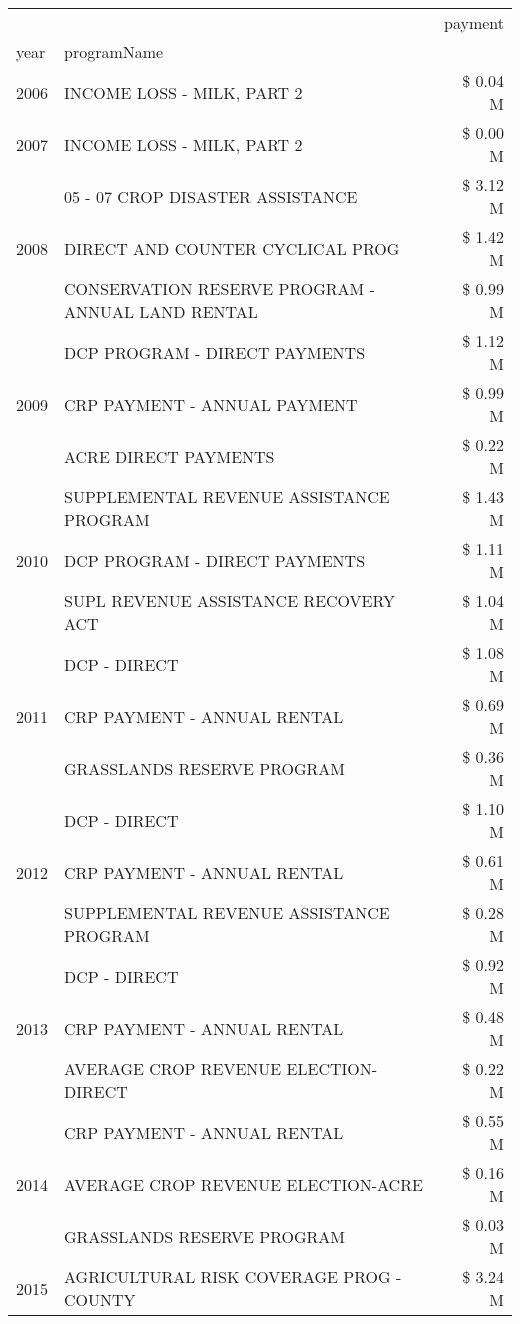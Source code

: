\begin{tabular}{llr}
\toprule
 &  & payment \\
year & programName &  \\
\midrule
2006 & INCOME LOSS - MILK, PART 2 & \$ 0.04 M \\
\cline{1-3}
2007 & INCOME LOSS - MILK, PART 2 & \$ 0.00 M \\
\cline{1-3}
\multirow[t]{3}{*}{2008} & 05 - 07 CROP DISASTER ASSISTANCE & \$ 3.12 M \\
 & DIRECT AND COUNTER CYCLICAL PROG & \$ 1.42 M \\
 & CONSERVATION RESERVE PROGRAM - ANNUAL LAND RENTAL & \$ 0.99 M \\
\cline{1-3}
\multirow[t]{3}{*}{2009} & DCP PROGRAM - DIRECT PAYMENTS & \$ 1.12 M \\
 & CRP PAYMENT - ANNUAL PAYMENT & \$ 0.99 M \\
 & ACRE DIRECT PAYMENTS & \$ 0.22 M \\
\cline{1-3}
\multirow[t]{3}{*}{2010} & SUPPLEMENTAL REVENUE ASSISTANCE PROGRAM & \$ 1.43 M \\
 & DCP PROGRAM - DIRECT PAYMENTS & \$ 1.11 M \\
 & SUPL REVENUE ASSISTANCE RECOVERY ACT & \$ 1.04 M \\
\cline{1-3}
\multirow[t]{3}{*}{2011} & DCP - DIRECT & \$ 1.08 M \\
 & CRP PAYMENT - ANNUAL RENTAL & \$ 0.69 M \\
 & GRASSLANDS RESERVE PROGRAM & \$ 0.36 M \\
\cline{1-3}
\multirow[t]{3}{*}{2012} & DCP - DIRECT & \$ 1.10 M \\
 & CRP PAYMENT - ANNUAL RENTAL & \$ 0.61 M \\
 & SUPPLEMENTAL REVENUE ASSISTANCE PROGRAM & \$ 0.28 M \\
\cline{1-3}
\multirow[t]{3}{*}{2013} & DCP - DIRECT & \$ 0.92 M \\
 & CRP PAYMENT - ANNUAL RENTAL & \$ 0.48 M \\
 & AVERAGE CROP REVENUE ELECTION-DIRECT & \$ 0.22 M \\
\cline{1-3}
\multirow[t]{3}{*}{2014} & CRP PAYMENT - ANNUAL RENTAL & \$ 0.55 M \\
 & AVERAGE CROP REVENUE ELECTION-ACRE & \$ 0.16 M \\
 & GRASSLANDS RESERVE PROGRAM & \$ 0.03 M \\
\cline{1-3}
\multirow[t]{3}{*}{2015} & AGRICULTURAL RISK COVERAGE PROG - COUNTY & \$ 3.24 M \\

\end{tabular}
